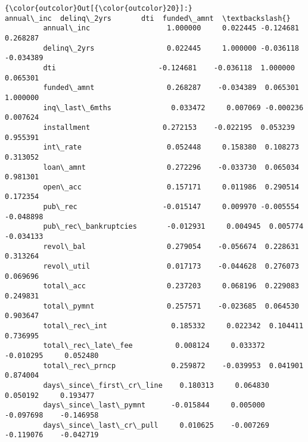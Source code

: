 \documentclass[10pt,notitlepage,onecolumn,aps,pra]{revtex4-1}
\begin{document}
            \begin{Verbatim}[commandchars=\\\{\}]
{\color{outcolor}Out[{\color{outcolor}20}]:}                           annual\_inc  delinq\_2yrs       dti  funded\_amnt  \textbackslash{}
         annual\_inc                  1.000000     0.022445 -0.124681     0.268287   
         delinq\_2yrs                 0.022445     1.000000 -0.036118    -0.034389   
         dti                        -0.124681    -0.036118  1.000000     0.065301   
         funded\_amnt                 0.268287    -0.034389  0.065301     1.000000   
         inq\_last\_6mths              0.033472     0.007069 -0.000236     0.007624   
         installment                 0.272153    -0.022195  0.053239     0.955391   
         int\_rate                    0.052448     0.158380  0.108273     0.313052   
         loan\_amnt                   0.272296    -0.033730  0.065034     0.981301   
         open\_acc                    0.157171     0.011986  0.290514     0.172354   
         pub\_rec                    -0.015147     0.009970 -0.005554    -0.048898   
         pub\_rec\_bankruptcies       -0.012931     0.004945  0.005774    -0.034133   
         revol\_bal                   0.279054    -0.056674  0.228631     0.313264   
         revol\_util                  0.017173    -0.044628  0.276073     0.069696   
         total\_acc                   0.237203     0.068196  0.229083     0.249831   
         total\_pymnt                 0.257571    -0.023685  0.064530     0.903647   
         total\_rec\_int               0.185332     0.022342  0.104411     0.736995   
         total\_rec\_late\_fee          0.008124     0.033372 -0.010295     0.052480   
         total\_rec\_prncp             0.259872    -0.039953  0.041901     0.874004   
         days\_since\_first\_cr\_line    0.180313     0.064830  0.050192     0.193477   
         days\_since\_last\_pymnt      -0.015844     0.005000 -0.097698    -0.146958   
         days\_since\_last\_cr\_pull     0.010625    -0.007269 -0.119076    -0.042719   
         

\end{Verbatim}
\end{document}
